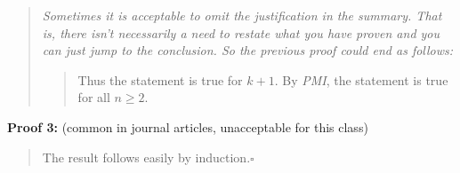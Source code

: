 \begin{exa}
\begin{quote}
{\em Sometimes it is acceptable to omit the justification in the summary.
That is, there isn't necessarily a need to restate what you have proven and
you can just jump to the conclusion.
So the previous proof could end as follows:}

\begin{quote}
Thus the statement is true for $k+1$. 
By {\em PMI}, the statement is true for all $n\geq 2$.
\end{quote}
\end{quote}


\noindent 
{\bf Proof 3:} (common in journal articles, unacceptable for this class)
\begin{quote}
The result follows easily by induction.\hfill$\square$
\end{quote}
\end{exa}

\newpage %

